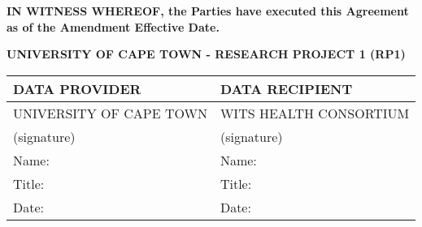 \documentclass[12pt,letterpaper]{article}
\newcommand{\added}[1]{\textcolor{addcolor}{#1}}
\begin{document}
\vspace{0.5cm}

\textbf{IN WITNESS WHEREOF, the Parties have executed this Agreement as of the \added{Amendment} Effective Date.}

\begin{center}
\textbf{UNIVERSITY OF CAPE TOWN - RESEARCH PROJECT 1 (RP1)}
\end{center}

\begin{tabular}{|p{}|p{}|}
\hline
\textbf{DATA PROVIDER} & \textbf{DATA RECIPIENT} \\
\hline
UNIVERSITY OF CAPE TOWN & WITS HEALTH CONSORTIUM \\
\hline
(signature) & (signature) \\
\hline
Name: & Name: \\
\hline
Title: & Title: \\
\hline
Date: & Date: \\
\hline
\end{tabular}
\end{document}
